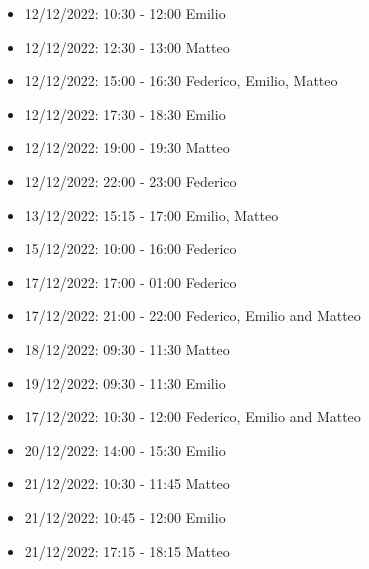 \begin{itemize}
    \item 12/12/2022: 10:30 - 12:00 Emilio
    \item 12/12/2022: 12:30 - 13:00 Matteo
    \item 12/12/2022: 15:00 - 16:30 Federico, Emilio, Matteo
    \item 12/12/2022: 17:30 - 18:30 Emilio
    \item 12/12/2022: 19:00 - 19:30 Matteo
    \item 12/12/2022: 22:00 - 23:00 Federico
    \item 13/12/2022: 15:15 - 17:00 Emilio, Matteo
    \item 15/12/2022: 10:00 - 16:00 Federico
    \item 17/12/2022: 17:00 - 01:00 Federico
    \item 17/12/2022: 21:00 - 22:00 Federico, Emilio and Matteo
    \item 18/12/2022: 09:30 - 11:30 Matteo
    \item 19/12/2022: 09:30 - 11:30 Emilio
    \item 17/12/2022: 10:30 - 12:00 Federico, Emilio and Matteo
    \item 20/12/2022: 14:00 - 15:30 Emilio
    \item 21/12/2022: 10:30 - 11:45 Matteo
    \item 21/12/2022: 10:45 - 12:00 Emilio
    \item 21/12/2022: 17:15 - 18:15 Matteo
\end{itemize}